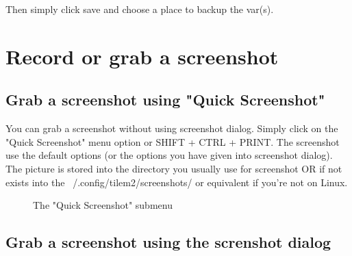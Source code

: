 \documentclass[10pt]{report}
\begin{document}
Then simply click save and choose a place to backup the var(s).\newline


\section{Record or grab a screenshot}

\subsection{Grab a screenshot using "Quick Screenshot"}

You can grab a screenshot without using screenshot dialog.\newline
Simply click on the "Quick Screenshot" menu option or SHIFT + CTRL + PRINT.\newline
The screenshot use the default options (or the options you have given into screenshot dialog).\newline
The picture is stored into the directory you usually use for screenshot OR if not exists into the ~/.config/tilem2/screenshots/ or equivalent if you're not on Linux.\newline

\begin{figure}[H]
\centering
{}
\caption{The "Quick Screenshot" submenu}
\end{figure}

\subsection{Grab a screenshot using the screnshot dialog}
\end{document}
